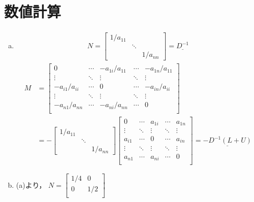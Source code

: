 \section{数値計算}
\begin{enumerate}[(a)]
  \item
  \begin{align*}
    N = 
    \begin{bmatrix}
      1/a_{11} & & \\
      & \ddots & \\
      & & 1/a_{nn}
    \end{bmatrix}
    = \underline{D^{-1}}
  \end{align*}
  \begin{align*}
    M &=
    \begin{bmatrix}
      0 & \cdots & -a_{1i}/a_{11}  & \cdots & -a_{1n}/a_{11} \\
      \vdots & \ddots  & \vdots  & \ddots & \vdots \\
      -a_{i1}/a_{ii} & \cdots  & 0  & \cdots & -a_{in}/a_{ii} \\
      \vdots & \ddots &  \vdots & \ddots & \vdots \\
      -a_{n1}/a_{nn} & \cdots & -a_{ni}/a_{nn} & \cdots & 0 \\
    \end{bmatrix} \\
    &=-
    \begin{bmatrix}
      1/a_{11} & & \\
      & \ddots & \\
      & & 1/a_{nn}
    \end{bmatrix}
    \begin{bmatrix}
      0 & \cdots & a_{1i} & \cdots & a_{1n} \\
      \vdots & \ddots & \vdots & \ddots & \vdots \\
      a_{i1} & \cdots & 0  & \cdots & a_{in} \\
      \vdots & \ddots & \vdots & \ddots & \vdots \\
      a_{n1} & \cdots & a_{ni} & \cdots & 0 \\
    \end{bmatrix}
    = \underline{-D^{-1}(L+U)}
  \end{align*}
  \item (a)より，
  \begin{math}
    N=
    \begin{bmatrix}
      1/4 & 0 \\
      0 & 1/2 \\

\end{bmatrix}
\end{math}
\end{enumerate}
